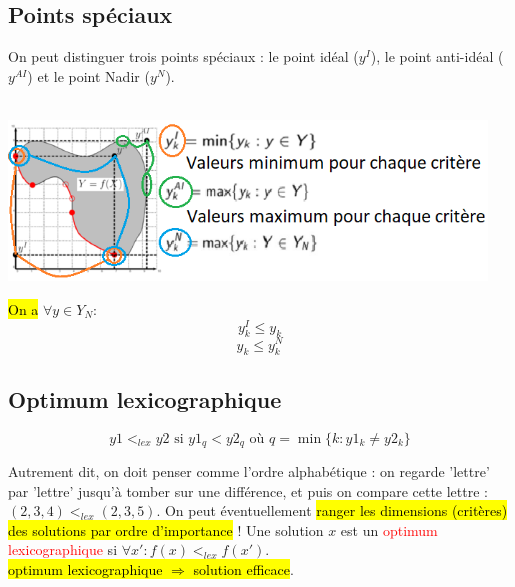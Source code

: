 \documentclass[a4paper, 12pt]{article}
\newcommand{\alinea}{
\hspace*{0.5cm}}
\newcommand{\red}[1]{
	\textcolor{red}{#1}}
\begin{document}
	\subsection{Points spéciaux}
		\alinea On peut distinguer trois points spéciaux : le point idéal ($y^I$), le point anti-idéal ($y^{AI}$) et le 
			point Nadir ($y^N$).~\\~\\
			\begin{minipage}{0.8\textwidth}
				\includegraphics[width=5in]{Images/points}
			\end{minipage}\hfill
			\begin{minipage}{0.19\textwidth}
				\hl{On a} $ \forall y \in Y_N:  $
				$$ y_k^{I} \leqslant y_k $$
				$$ y_k \leqslant y_k^N $$
			\end{minipage}
	\subsection{Optimum lexicographique}
		$$ y1 <_{lex} y2 \text{\ \ \ si\ \ \ } y1_q < y2_q \text{\ \ \ où\ \ \ } q = \min\{k: y1_k \neq y2_k\} $$
		\alinea Autrement dit, on doit penser comme l'ordre alphabétique : on regarde 'lettre' par 'lettre' jusqu'à tomber sur une
			différence, et puis on compare cette lettre : $ (2, 3, 4) <_{lex} (2, 3, 5) $. On peut éventuellement \hl{ranger les
			dimensions (critères) des solutions par ordre d'importance} ! Une solution $x$ est un \red{optimum lexicographique}
			si $\forall x': f(x) <_{lex} f(x') $. \\ \hl{optimum lexicographique $\Rightarrow$ solution efficace}.
\end{document}
